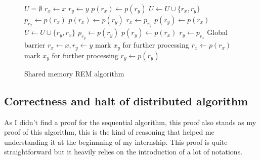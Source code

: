 \documentclass[12px]{article}
\begin{document}
      \begin{figure}
        \centering
        \begin{minipage}{8cm}
          \begin{algorithm}[H]
            \caption{Shared memory REM algorithm}%
            \label{alg:shared_rem}
            \begin{algorithmic}[1]
              \State $U = \emptyset$
              \State
                \State $r_x \gets x$
                \State $r_y \gets y$
                \State
                      \State $p(r_x) \gets p(r_y)$
                      \State $U \gets U \cup \{r_x, r_y\}$
                    \Else
                      \State $p_{r_x} \gets p(r_x)$
                      \State $p(r_x) \gets p(r_y)$
                      \State $r_x \gets p_{r_y}$
                    \EndIf
                  \Else
                      \State $p(r_y) \gets p(r_x)$
                      \State $U \gets U \cup \{r_y, r_x\}$
                    \Else
                      \State $p_{r_y} \gets p(r_y)$
                      \State $p(r_y) \gets p(r_x)$
                      \State $r_y \gets p_{r_x}$
                    \EndIf
                  \EndIf
                \EndWhile
              \EndFor
              \State
              \State Global barrier
              \State
                \State $r_x \gets x, r_y \gets y$
                      \State mark $x_ y$ for further processing
                    \Else
                      \State $r_x \gets p(r_x)$
                    \EndIf
                  \Else
                      \State mark $x_ y$ for further processing
                    \Else
                      \State $r_y \gets p(r_y)$
                    \EndIf
                  \EndIf
                \EndWhile
              \EndFor
            \end{algorithmic}
          \end{algorithm}
        \end{minipage}
      \end{figure}

    \subsection{Correctness and halt of distributed algorithm}
      As I didn't find a proof for the sequential algorithm, this proof also stands as my proof of this algorithm, this is the kind of reasoning that helped me understanding it at the beginnning of my internship.
      This proof is quite straightforward but it heavily relies on the introduction of a lot of notations.
\end{document}
